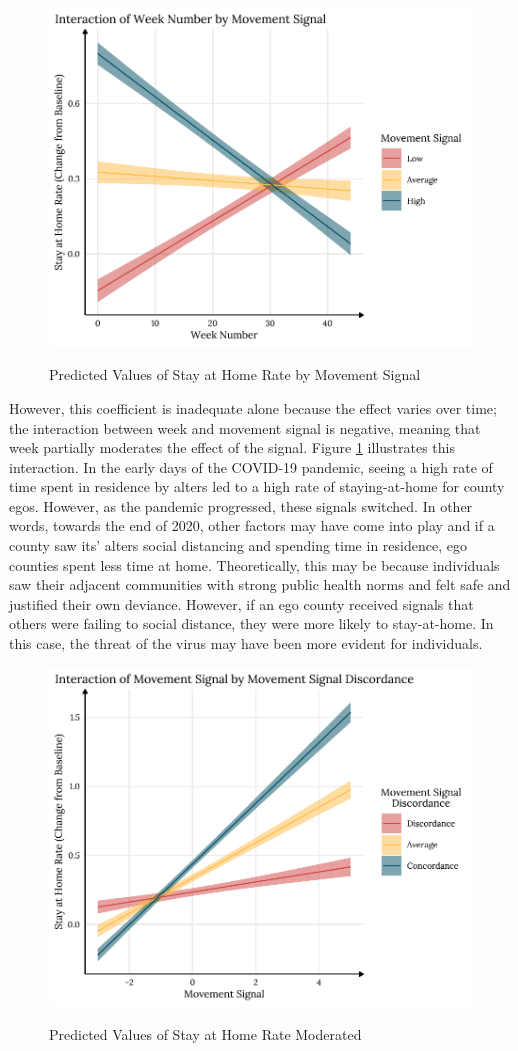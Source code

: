 \begin{figure}
{\centering \includegraphics[width=0.8\linewidth]{figs/paper3/plot-google-h2-1}}
\caption{Predicted Values of Stay at Home Rate by Movement Signal}\label{fig:plot-google-h2}
\end{figure}

However, this coefficient is inadequate alone because the effect varies over
time; the interaction between week and movement signal is negative, meaning that
week partially moderates the effect of the signal. Figure
\ref{fig:plot-google-h2} illustrates this interaction. In the early days of the
COVID-19 pandemic, seeing a high rate of time spent in residence by alters led
to a high rate of staying-at-home for county egos. However, as the pandemic
progressed, these signals switched. In other words, towards the end of 2020,
other factors may have come into play and if a county saw its' alters social
distancing and spending time in residence, ego counties spent less time at home.
Theoretically, this may be because individuals saw their adjacent communities
with strong public health norms and felt safe and justified their own deviance.
However, if an ego county received signals that
others were failing to social distance, they were more likely to stay-at-home.
In this case, the threat of the virus may have been more evident for
individuals.

\begin{figure}
{\centering \includegraphics[width=0.8\linewidth]{figs/paper3/plot-google-h3-1}}
\caption{Predicted Values of Stay at Home Rate Moderated}\label{fig:plot-google-h3}
\end{figure}

